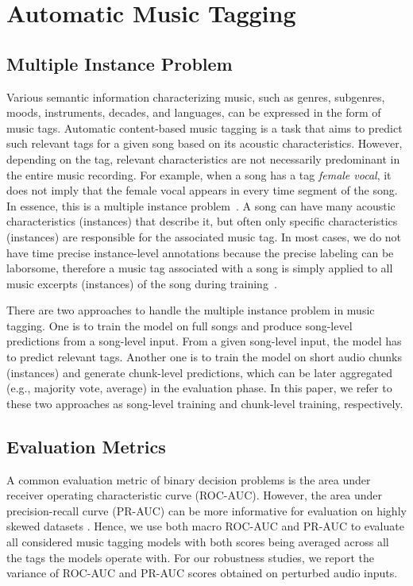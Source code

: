\documentclass{article}
\begin{document}
 \section{Automatic Music Tagging}\label{sec:MusicTagging}
\subsection{Multiple Instance Problem}
Various semantic information characterizing music, such as genres, subgenres, moods, instruments, decades, and languages, can be expressed in the form of music tags.
Automatic content-based music tagging is a task that aims to predict such relevant tags for a given song based on its acoustic characteristics. However, depending on the tag, relevant characteristics are not necessarily predominant in the entire music recording. For example, when a song has a tag \textit{female vocal}, it does not imply that the female vocal appears in every time segment of the song. 
In essence, this is a multiple instance problem~\cite{dietterich1997solving}. A song can have many acoustic characteristics (instances) that describe it, but often only specific characteristics (instances) are responsible for the associated music tag. In most cases, we do not have time precise instance-level annotations because the precise labeling can be laborsome, therefore a music tag associated with a song is simply applied to all music excerpts (instances) of the song during training~\cite{mcfee2018adaptive}. 








There are two approaches to handle the multiple instance problem in music tagging. One is to train the model on full songs and produce song-level predictions from a song-level input. 
From a given song-level input, the model has to predict relevant tags. Another one is to train the model on short audio chunks (instances) and generate chunk-level predictions, which can be later aggregated (e.g., majority vote, average) in the evaluation phase.
In this paper, we refer to these two approaches as song-level training and chunk-level training, respectively. 



\subsection{Evaluation Metrics}
A common evaluation metric of binary decision problems is the area under receiver operating characteristic curve (ROC-AUC). However, the area under precision-recall curve (PR-AUC) can be more informative for evaluation on highly skewed datasets \cite{davis2006relationship}. Hence, we use both macro ROC-AUC and PR-AUC to evaluate all considered music tagging models with both scores being averaged across all the tags the models operate with. For our robustness studies, we report the variance of ROC-AUC and PR-AUC scores obtained on perturbed audio inputs.
\end{document}
